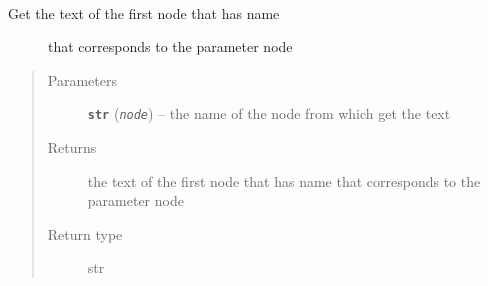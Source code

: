 \documentclass[a4paper,10pt,english]{sphinxmanual}
\begin{document}
\begin{fulllineitems}
\begin{fulllineitems}
\label{commands/apidoc/src:src.xmlManager.ReadXmlFile.get_node_text}~\begin{description}
\item[{Get the text of the first node that has name }] \leavevmode
that corresponds to the parameter node

\end{description}
\begin{quote}\begin{description}
\item[{Parameters}] \leavevmode
\textbf{\texttt{str}} (\emph{\texttt{node}}) -- the name of the node from which get the text

\item[{Returns}] \leavevmode
the text of the first node that has name 
that corresponds to the parameter node

\item[{Return type}] \leavevmode
str

\end{description}\end{quote}

\end{fulllineitems}


\end{fulllineitems}

\end{document}
